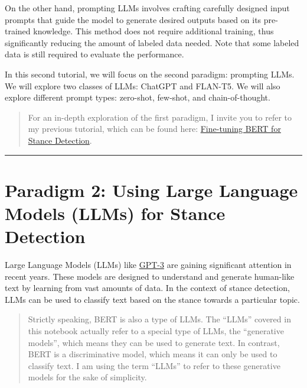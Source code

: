 \documentclass[11pt]{article}
\begin{document}
On the other hand, prompting LLMs involves crafting carefully designed
input prompts that guide the model to generate desired outputs based on
its pre-trained knowledge. This method does not require additional
training, thus significantly reducing the amount of labeled data needed.
Note that some labeled data is still required to evaluate the
performance.

In this second tutorial, we will focus on the second paradigm: prompting
LLMs. We will explore two classes of LLMs: ChatGPT and FLAN-T5. We will
also explore different prompt types: zero-shot, few-shot, and
chain-of-thought.

    \begin{quote}
For an in-depth exploration of the first paradigm, I invite you to refer
to my previous tutorial, which can be found here:
\href{https://colab.research.google.com/drive/1nxziaKStwRnSyOLI6pLNBaAnB_aB6IsE?usp=sharing}{Fine-tuning
BERT for Stance Detection}.
\end{quote}

    \begin{center}\rule{0.5\linewidth}{0.5pt}\end{center}

    \hypertarget{paradigm-2-using-large-language-models-llms-for-stance-detection}{%
\section{Paradigm 2: Using Large Language Models (LLMs) for Stance
Detection}\label{paradigm-2-using-large-language-models-llms-for-stance-detection}}

Large Language Models (LLMs) like
\href{https://arxiv.org/abs/2005.14165}{GPT-3} are gaining significant
attention in recent years. These models are designed to understand and
generate human-like text by learning from vast amounts of data. In the
context of stance detection, LLMs can be used to classify text based on
the stance towards a particular topic.

    \begin{quote}
Strictly speaking, BERT is also a type of LLMs. The ``LLMs'' covered in
this notebook actually refer to a special type of LLMs, the ``generative
models'', which means they can be used to generate text. In contrast,
BERT is a discriminative model, which means it can only be used to
classify text. I am using the term ``LLMs'' to refer to these generative
models for the sake of simplicity.
\end{quote}
\end{document}
